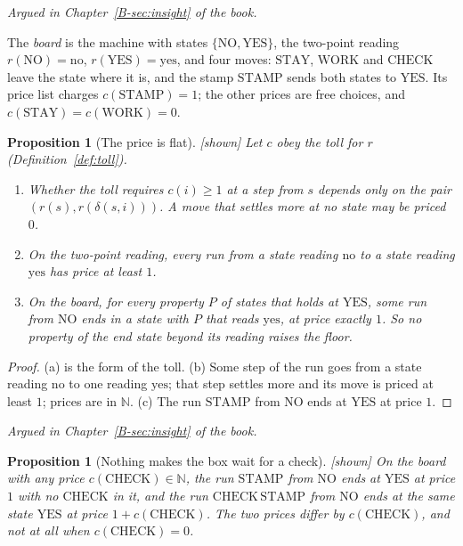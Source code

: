 \documentclass[11pt, a4paper]{article}
\theoremstyle{plain}
\newtheorem{proposition}[theorem]{Proposition}
\theoremstyle{definition}
\theoremstyle{remark}
\newcommand{\N}{\mathbb{N}}
\newcommand{\step}{\delta}
\newcommand{\cost}{c}
\newcommand{\rd}{r}
\newcommand{\argued}[1]{\par\noindent\textit{Argued in Chapter~\ref{B-#1} of the book.}\par}
\newcommand{\kind}[1]{\textup{[#1]}}
\begin{document}
\argued{sec:insight}

The \emph{board} is the machine with states $\{\mathrm{NO},\mathrm{YES}\}$, the two-point reading
$\rd(\mathrm{NO})=\mathrm{no}$, $\rd(\mathrm{YES})=\mathrm{yes}$, and four moves: $\mathrm{STAY}$,
$\mathrm{WORK}$ and $\mathrm{CHECK}$ leave the state where it is, and the stamp $\mathrm{STAMP}$ sends both
states to $\mathrm{YES}$. Its price list charges $\cost(\mathrm{STAMP})=1$; the other prices are free
choices, and $\cost(\mathrm{STAY})=\cost(\mathrm{WORK})=0$.

\begin{proposition}[The price is flat]\label{spec:price-flat} \kind{shown}
Let $\cost$ obey the toll for $\rd$ (Definition~\ref{def:toll}).
\begin{enumerate}[label=(\alph*)]
\item Whether the toll requires $\cost(i)\ge1$ at a step from $s$ depends only on the pair
$(\rd(s),\rd(\step(s,i)))$. A move that settles more at no state may be priced $0$.
\item On the two-point reading, every run from a state reading $\mathrm{no}$ to a state reading
$\mathrm{yes}$ has price at least $1$.
\item On the board, for every property $P$ of states that holds at
$\mathrm{YES}$, some run from $\mathrm{NO}$ ends in a state with $P$ that reads $\mathrm{yes}$, at price
exactly $1$. So no property of the end state beyond its reading raises the floor.
\end{enumerate}
\end{proposition}

\begin{proof}
(a) is the form of the toll. (b) Some step of the run goes from a state reading $\mathrm{no}$ to one reading
$\mathrm{yes}$; that step settles more and its move is priced at least $1$; prices are in $\N$.
(c) The run $\mathrm{STAMP}$ from $\mathrm{NO}$ ends at $\mathrm{YES}$ at price $1$.
\end{proof}

\argued{sec:insight}

\begin{proposition}[Nothing makes the box wait for a check]\label{spec:no-wait} \kind{shown}
On the board with any price $\cost(\mathrm{CHECK})\in\N$, the run $\mathrm{STAMP}$ from $\mathrm{NO}$ ends at
$\mathrm{YES}$ at price $1$ with no $\mathrm{CHECK}$ in it, and the run $\mathrm{CHECK}\,\mathrm{STAMP}$ from
$\mathrm{NO}$ ends at the same state $\mathrm{YES}$ at price $1+\cost(\mathrm{CHECK})$. The two prices
differ by $\cost(\mathrm{CHECK})$, and not at all when $\cost(\mathrm{CHECK})=0$.
\end{proposition}
\end{document}
